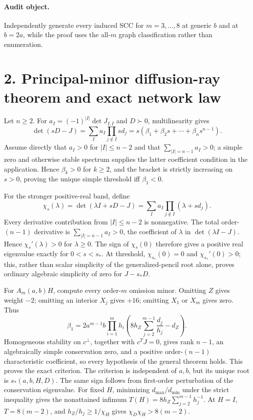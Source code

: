 \documentclass[10pt]{article}
\begin{document}
\paragraph{Audit object.} Independently generate every induced SCC for $m=3,\ldots,8$ at generic $b$ and at $b=2a$, while the proof uses the all-$m$ graph classification rather than enumeration.

\newpage
\section*{2. Principal-minor diffusion-ray theorem and exact network law}
Let $n\ge2$.  For $a_I=(-1)^{|I|}\det J_{I,I}$ and $D\succ0$,
multilinearity gives
\[
\det(sD-J)=\sum_Ia_I\prod_{j\notin I}sd_j
=s(\beta_1+\beta_2s+\cdots+\beta_ns^{n-1}).
\]
Assume directly that $a_I>0$ for $|I|\le n-2$ and that
$\sum_{|I|=n-1}a_I>0$; a simple zero and otherwise stable spectrum supplies
the latter coefficient condition in the application.  Hence $\beta_k>0$
for $k\ge2$, and the bracket is strictly increasing on $s>0$, proving the
unique simple threshold iff $\beta_1<0$.

For the stronger positive-real band, define
\[
\chi_s(\lambda)=\det(\lambda I+sD-J)
=\sum_Ia_I\prod_{j\notin I}(\lambda+sd_j).
\]
Every derivative contribution from $|I|\le n-2$ is nonnegative. The total
order-$(n-1)$ derivative is $\sum_{|I|=n-1}a_I>0$, the coefficient of
$\lambda$ in $\det(\lambda I-J)$. Hence $\chi_s'(\lambda)>0$ for $\lambda\ge0$. The sign of $\chi_s(0)$ therefore gives a positive real eigenvalue exactly for $0<s<s_*$.
At threshold, $\chi_{s_*}(0)=0$ and $\chi_{s_*}'(0)>0$; this, rather than
scalar simplicity of the generalized-pencil root alone, proves ordinary
algebraic simplicity of zero for $J-s_*D$.

For $A_m(a,b)H$, compute every order-$m$ omission minor. Omitting $Z$ gives weight $-2$; omitting an interior $X_j$ gives $+16$; omitting $X_1$ or $X_m$ gives zero. Thus
\[
\beta_1=2a^{m-1}b\prod_{i=1}^mh_i
\left(8h_Z\sum_{j=2}^{m-1}\frac{d_j}{h_j}-d_Z\right).
\]
Homogeneous stability on $c^\perp$, together with $c^TJ=0$, gives rank
$n-1$, an algebraically simple conservation zero, and a positive
order-$(n-1)$ characteristic coefficient, so every hypothesis of the general
theorem holds.  This proves the exact criterion.  The criterion is independent
of $a,b$, but its unique root is $s_*(a,b,H,D)$.  The same sign follows from
first-order perturbation of the conservation eigenvalue. For fixed $H$,
minimizing $d_{\max}/d_{\min}$ under the strict inequality gives the
nonattained infimum $T(H)=8h_Z\sum_{j=2}^{m-1} h_j^{-1}$. At $H=I$,
$T=8(m-2)$, and $h_Z/h_j\ge1/\chi_H$ gives
$\chi_D\chi_H>8(m-2)$.
\end{document}
